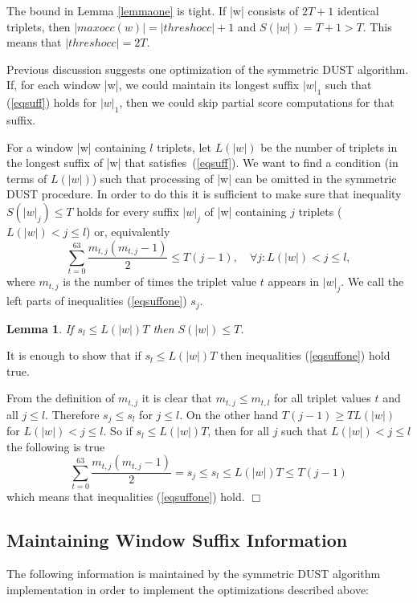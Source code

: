 \documentclass{article}
\newtheorem{lemma}{Lemma}
\begin{document}
The bound in Lemma \ref{lemmaone} is tight. If |w| consists of $2T + 1$
identical triplets, then $|maxocc(w)| = |threshocc| + 1$ and $S(|w|) = T + 1 > T$.
This means that $|threshocc| = 2T$.

Previous discussion suggests one optimization of the symmetric DUST algorithm.
If, for each window |w|, we could maintain its longest suffix $|w|_1$ such that
(\ref{eqsuff}) holds for $|w|_1$, then we could skip partial score computations
for that suffix.

For a window |w| containing $l$ triplets, let $L(|w|)$ be the number of triplets 
in the longest suffix of |w| that satisfies~(\ref{eqsuff}). We want to find a 
condition (in terms of $L(|w|)$) such that processing of |w| can be omitted in the 
symmetric DUST procedure. In order to do this it is sufficient to make sure that 
inequality $S(|w|_j) \le T$ holds for every suffix $|w|_j$ of |w| containing $j$ 
triplets ($L(|w|) < j \le l$) or, equivalently
\begin{equation}\label{eqsuffone}
\sum_{t=0}^{63}{\frac{m_{t,j}(m_{t,j} - 1)}{2}} \le T(j - 1),%
\quad \forall j : L(|w|) < j \le l,
\end{equation}
where $m_{t,j}$ is the number of times the triplet value $t$ appears in 
$|w|_j$. We call the left parts of inequalities (\ref{eqsuffone}) $s_j$.

\begin{lemma}\label{lemmatwo}
If $s_l \le L(|w|)T$ then $S(|w|) \le T$.
\end{lemma}

\proof It is enough to show that if $s_l \le L(|w|)T$ then inequalities
(\ref{eqsuffone}) hold true. 

From the definition of $m_{t,j}$ it is clear that 
$m_{t,j} \le m_{t,l}$ for all triplet values $t$ and all $j \le l$. Therefore
$s_j \le s_l$ for $j \le l$. On the other hand $T(j-1) \ge TL(|w|)$ for 
$L(|w|) < j \le l$. So if $s_l \le L(|w|)T$, then for all $j$ such that 
$L(|w|) < j \le l$ the following is true
$$
\sum_{t=0}^{63}{\frac{m_{t,j}(m_{t,j} - 1)}{2}} = s_j \le s_l \le L(|w|)T \le T(j-1)
$$
which means that inequalities (\ref{eqsuffone}) hold. $\Box$

\subsection{Maintaining Window Suffix Information}

The following information is maintained by the symmetric DUST algorithm
implementation in order to implement the optimizations described above:
\end{document}
